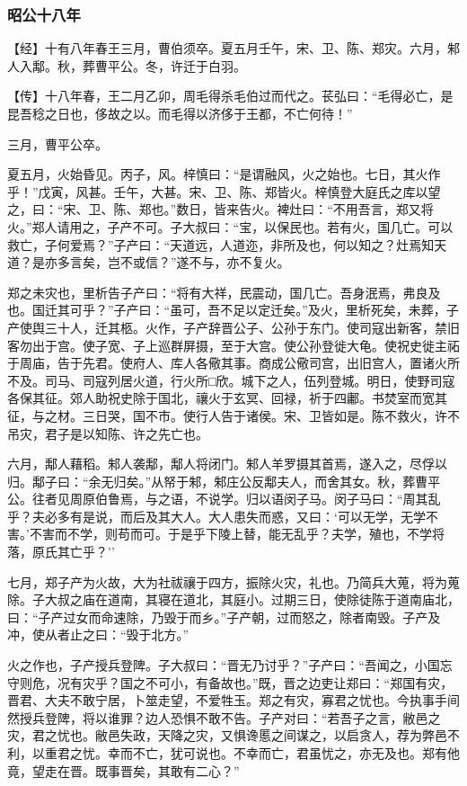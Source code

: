 \documentclass[]{article}
\begin{document}
\hypertarget{header-n2659}{%
\subsubsection{昭公十八年}\label{header-n2659}}

【经】十有八年春王三月，曹伯须卒。夏五月壬午，宋、卫、陈、郑灾。六月，邾人入鄅。秋，葬曹平公。冬，许迁于白羽。

【传】十八年春，王二月乙卯，周毛得杀毛伯过而代之。苌弘曰：``毛得必亡，是昆吾稔之日也，侈故之以。而毛得以济侈于王都，不亡何待！''

三月，曹平公卒。

夏五月，火始昏见。丙子，风。梓慎曰：``是谓融风，火之始也。七日，其火作乎！''戊寅，风甚。壬午，大甚。宋、卫、陈、郑皆火。梓慎登大庭氏之库以望之，曰：``宋、卫、陈、郑也。''数日，皆来告火。裨灶曰：``不用吾言，郑又将火。''郑人请用之，子产不可。子大叔曰：``宝，以保民也。若有火，国几亡。可以救亡，子何爱焉？''子产曰：``天道远，人道迩，非所及也，何以知之？灶焉知天道？是亦多言矣，岂不或信？''遂不与，亦不复火。

郑之未灾也，里析告子产曰：``将有大祥，民震动，国几亡。吾身泯焉，弗良及也。国迁其可乎？''子产曰：``虽可，吾不足以定迁矣。''及火，里析死矣，未葬，子产使舆三十人，迁其柩。火作，子产辞晋公子、公孙于东门。使司寇出新客，禁旧客勿出于宫。使子宽、子上巡群屏摄，至于大宫。使公孙登徙大龟。使祝史徙主祏于周庙，告于先君。使府人、库人各儆其事。商成公儆司宫，出旧宫人，置诸火所不及。司马、司寇列居火道，行火所□欣。城下之人，伍列登城。明日，使野司寇各保其征。郊人助祝史除于国北，禳火于玄冥、回禄，祈于四鄘。书焚室而宽其征，与之材。三日哭，国不市。使行人告于诸侯。宋、卫皆如是。陈不救火，许不吊灾，君子是以知陈、许之先亡也。

六月，鄅人藉稻。邾人袭鄅，鄅人将闭门。邾人羊罗摄其首焉，遂入之，尽俘以归。鄅子曰：``余无归矣。''从帑于邾，邾庄公反鄅夫人，而舍其女。秋，葬曹平公。往者见周原伯鲁焉，与之语，不说学。归以语闵子马。闵子马曰：``周其乱乎？夫必多有是说，而后及其大人。大人患失而惑，又曰：`可以无学，无学不害。'不害而不学，则苟而可。于是乎下陵上替，能无乱乎？夫学，殖也，不学将落，原氏其亡乎？''

七月，郑子产为火故，大为社祓禳于四方，振除火灾，礼也。乃简兵大蒐，将为蒐除。子大叔之庙在道南，其寝在道北，其庭小。过期三日，使除徒陈于道南庙北，曰：``子产过女而命速除，乃毁于而乡。''子产朝，过而怒之，除者南毁。子产及冲，使从者止之曰：``毁于北方。''

火之作也，子产授兵登陴。子大叔曰：``晋无乃讨乎？''子产曰：``吾闻之，小国忘守则危，况有灾乎？国之不可小，有备故也。''既，晋之边吏让郑曰：``郑国有灾，晋君、大夫不敢宁居，卜筮走望，不爱牲玉。郑之有灾，寡君之忧也。今执事手间然授兵登陴，将以谁罪？边人恐惧不敢不告。子产对曰：``若吾子之言，敝邑之灾，君之忧也。敝邑失政，天降之灾，又惧谗慝之间谋之，以启贪人，荐为弊邑不利，以重君之忧。幸而不亡，犹可说也。不幸而亡，君虽忧之，亦无及也。郑有他竟，望走在晋。既事晋矣，其敢有二心？''
\end{document}
